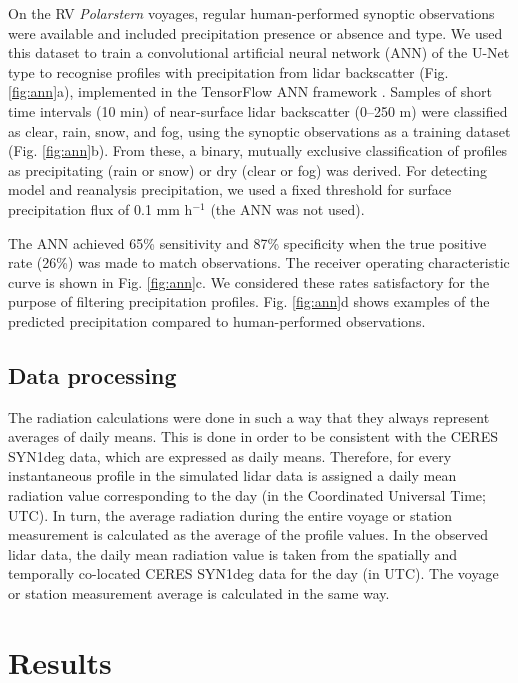 \documentclass[12pt,a4paper]{article}
\begin{document}
On the RV \emph{Polarstern} voyages, regular human-performed synoptic
observations were available and included precipitation presence or absence and
type. We used this dataset to train a convolutional artiﬁcial neural network
(ANN) of the U-Net type \citep{ronneberger2015} to recognise profiles with
precipitation from lidar backscatter (Fig. \ref{fig:ann}a), implemented in the
TensorFlow ANN framework \citep{tensorflow}. Samples of short time intervals
(10 min) of near-surface lidar backscatter (0–250 m) were classified as clear,
rain, snow, and fog, using the synoptic observations as a training dataset
(Fig.  \ref{fig:ann}b). From these, a binary, mutually exclusive classification
of profiles as precipitating (rain or snow) or dry (clear or fog) was derived.
For detecting model and reanalysis precipitation, we used a fixed threshold for
surface precipitation flux of 0.1 mm h$^{-1}$ (the ANN was not used).

The ANN achieved 65\% sensitivity and 87\% speciﬁcity when the true positive
rate (26\%) was made to match observations. The receiver operating
characteristic curve is shown in Fig. \ref{fig:ann}c. We considered these rates
satisfactory for the purpose of filtering precipitation profiles. Fig.
\ref{fig:ann}d shows examples of the predicted precipitation compared to
human-performed observations.

\subsection{Data processing}

The radiation calculations were done in such a way that they always represent
averages of daily means. This is done in order to be consistent with the CERES
SYN1deg data, which are expressed as daily means. Therefore, for every
instantaneous profile in the simulated lidar data is assigned a daily mean
radiation value corresponding to the day (in the Coordinated Universal Time;
UTC). In turn, the average radiation during the entire voyage or station
measurement is calculated as the average of the profile values. In the observed
lidar data, the daily mean radiation value is taken from the spatially and
temporally co-located CERES SYN1deg data for the day (in UTC). The voyage or
station measurement average is calculated in the same way.

\section{Results}
\label{sec:results}
\end{document}
